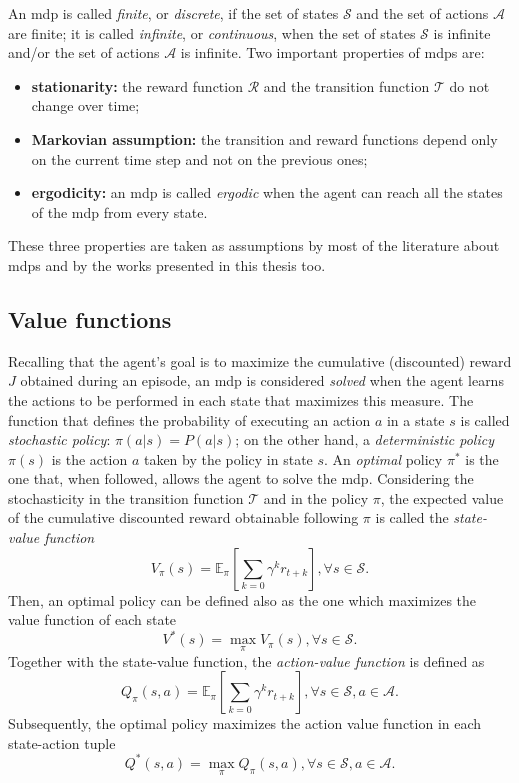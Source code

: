 An \gls{mdp} is called \textit{finite}, or \textit{discrete}, if the set of states $\mathcal{S}$ and the set of actions $\mathcal{A}$ are finite; it is called \textit{infinite}, or \textit{continuous}, when the set of states $\mathcal{S}$ is infinite and/or the set of actions $\mathcal{A}$ is infinite.
Two important properties of \glspl{mdp} are:
\begin{itemize}
 \item \textbf{stationarity:} the reward function $\mathcal{R}$ and the transition function $\mathcal{T}$ do not change over time;
 \item \textbf{Markovian assumption:} the transition and reward functions depend only on the current time step and not on the previous ones;
 \item \textbf{ergodicity:} an \gls{mdp} is called \textit{ergodic} when the agent can reach all the states of the \gls{mdp} from every state.
\end{itemize}
These three properties are taken as assumptions by most of the literature about \glspl{mdp} and by the works presented in this thesis too.

\subsection{Value functions}
Recalling that the agent's goal is to maximize the cumulative (discounted) reward $J$ obtained during an episode, an \gls{mdp} is considered \textit{solved} when the agent learns the actions to be performed in each state that maximizes this measure. The function that defines the probability of executing an action $a$ in a state $s$ is called \textit{stochastic policy}: $\pi(a|s) = P(a|s)$; on the other hand, a \textit{deterministic policy} $\pi(s)$ is the action $a$ taken by the policy in state $s$. An \textit{optimal} policy $\pi^*$ is the one that, when followed, allows the agent to solve the \gls{mdp}. Considering the stochasticity in the transition function $\mathcal{T}$ and in the policy $\pi$, the expected value of the cumulative discounted reward obtainable following $\pi$ is called the \textit{state-value function}
\begin{equation}
 V_\pi(s) = \mathbb{E}_\pi\left[\sum_{k=0} \gamma^k r_{t+k}\right], \forall s \in \mathcal{S}.
\end{equation}
Then, an optimal policy can be defined also as the one which maximizes the value function of each state
\begin{equation}
 V^*(s) = \max_\pi V_\pi(s), \forall s \in \mathcal{S}.
\end{equation}
Together with the state-value function, the \textit{action-value function} is defined as
\begin{equation}
 Q_\pi(s, a) = \mathbb{E}_\pi\left[\sum_{k=0} \gamma^k r_{t+k}\right], \forall s \in \mathcal{S}, a \in \mathcal{A}.
\end{equation}
Subsequently, the optimal policy maximizes the action value function in each state-action tuple
\begin{equation}
 Q^*(s,a) = \max_\pi Q_\pi(s,a), \forall s \in \mathcal{S}, a \in \mathcal{A}.
\end{equation}

